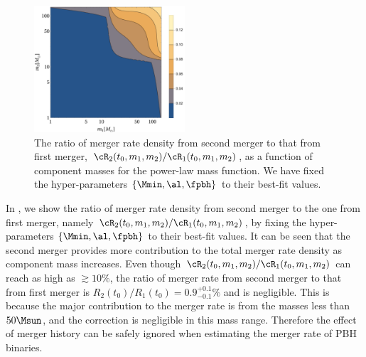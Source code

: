 \documentclass[
reprint,           %
superscriptaddress,%
amsmath,           %
amssymb,           %
aps,               %
prd,               %
notitlepage,       %
longbibliography,  %
floatfix,          %
nofootinbib,
]{revtex4-1}
\begin{document}
\begin{figure}[htbp!]
	\centering
	\includegraphics[width=0.5\textwidth]{ratio-power.pdf}
	\caption{\label{ratio-power}The ratio of merger rate density from second merger to that from first merger, $\cR_2(t_0, m_1, m_2)/\cR_1(t_0, m_1, m_2)$, as a function of component masses for the power-law mass function. We have fixed the hyper-parameters $\{\Mmin, \al, \fpbh\}$ to their best-fit values.}
\end{figure}

In , we show the ratio of merger rate density from second merger to the one from first merger, namely $\cR_2(t_0, m_1, m_2)/\cR_1(t_0, m_1, m_2)$, by fixing the hyper-parameters $\{\Mmin, \al, \fpbh\}$ to their best-fit values. It can be seen that the second merger provides more contribution to the total merger rate density as component mass increases. Even though $\cR_2(t_0, m_1, m_2)/\cR_1(t_0, m_1, m_2)$ can reach as high as $\gtrsim 10\%$, the ratio of merger rate from second merger to that from first merger is $R_2(t_0)/R_1(t_0) = 0.9^{+0.1}_{-0.1}\%$ and is negligible. This is because the major contribution to the merger rate is from the masses less than $50\Msun$, and the correction is negligible in this mass range. Therefore the effect of merger history can be safely ignored when estimating the merger rate of PBH binaries.

\end{document}

